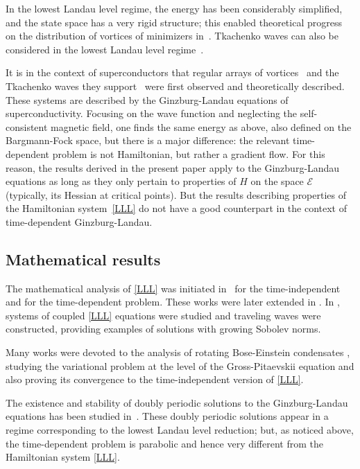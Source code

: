 \documentclass[10pt]{amsart}
\theoremstyle{definition}
\begin{document}
In the lowest Landau level regime, the energy has been considerably simplified, and the state space has a very rigid structure; this enabled theoretical progress on the distribution of vortices of minimizers in~\cite{ABD,Ho,WBP}. Tkachenko waves can also be considered in the lowest Landau level regime~\cite{Baym,Sonin}.

It is in the context of superconductors that regular arrays of vortices~\cite{Abrikosov} and the Tkachenko waves they support~\cite{Tkachenko} were first observed and theoretically described. These systems are described by the Ginzburg-Landau equations of superconductivity.
Focusing on the wave function and neglecting the self-consistent magnetic field, one finds the same energy as above, also defined on the Bargmann-Fock space, but there is a major difference: the relevant time-dependent problem is not Hamiltonian, but rather a gradient flow.
For this reason, the results derived in the present paper apply to the Ginzburg-Landau equations as long as they only pertain to properties of $H$ on the space $\mathcal{E}$ (typically, its Hessian at critical points). But the results describing properties of the Hamiltonian system~\eqref{LLL} do not have a good counterpart in the context of time-dependent Ginzburg-Landau.\enlargethispage{.5\baselineskip}%

\subsection{Mathematical results}

The mathematical analysis of \eqref{LLL} was initiated in~\cite{ABN} for the time-independent and \cite{Nier1} for the time-dependent problem. These works were later extended in \cite{GGT, Sch}. In \cite{SchTho, Tho1}, systems of coupled \eqref{LLL} equations were studied and traveling waves were constructed, providing examples of solutions with growing Sobolev norms.

Many works were devoted to the analysis of rotating Bose-Einstein condensates \cite{AB,BR,Rou2,Rou1,RSY2}, studying the variational problem at the level of the Gross-Pitaevskii equation and also proving its convergence to the time-independent version of \eqref{LLL}.

The existence and stability of doubly periodic solutions to the Ginzburg-Landau equations has been studied in~\cite{Sigal-Tza1, Sigal-Tza2, Sigal-Tza3}. These doubly periodic solutions appear in a regime corresponding to the lowest Landau level reduction; but, as noticed above, the time-dependent problem is parabolic and hence very different from the Hamiltonian system \eqref{LLL}.
\end{document}
